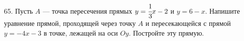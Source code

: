 65. Пусть $A$ --- точка пересечения прямых $y=\cfrac{1}{3}x-2$ и $y=6-x.$ Напишите уравнение прямой, проходящей через точку $A$ и пересекающейся с прямой $y=-4x-3$ в точке, лежащей на оси $Oy.$ Постройте эту прямую.\\
